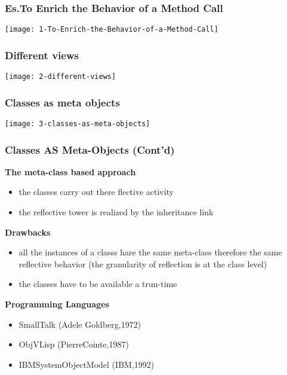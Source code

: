 \subsubsection{Es.To Enrich the Behavior of a Method Call}

\begin{center}
\texttt{[image: 1-To-Enrich-the-Behavior-of-a-Method-Call]}
\end{center}

\subsubsection{Different views}

\begin{center}
\texttt{[image: 2-different-views]}
\end{center}

\subsubsection{Classes as meta objects}

\begin{center}
\texttt{[image: 3-classes-as-meta-objects]}
\end{center}

\subsubsection{Classes AS Meta-Objects (Cont'd)}
\textbf{The meta-class based approach}
\begin{itemize}
	\item the classes carry out there flective activity
	\item the reflective tower is realized by the inheritance link
\end{itemize}

\textbf{Drawbacks}
\begin{itemize}
	\item all the instances of a classs hare the same meta-class therefore the same reflective behavior (the granularity of reflection is at the class level)
	\item the classes have to be available a trun-time
\end{itemize}

\textbf{Programming Languages}
\begin{itemize}
	\item SmallTalk (Adele Goldberg,1972)
	\item ObjVLisp (PierreCointe,1987)
	\item IBMSystemObjectModel (IBM,1992)
\end{itemize}

